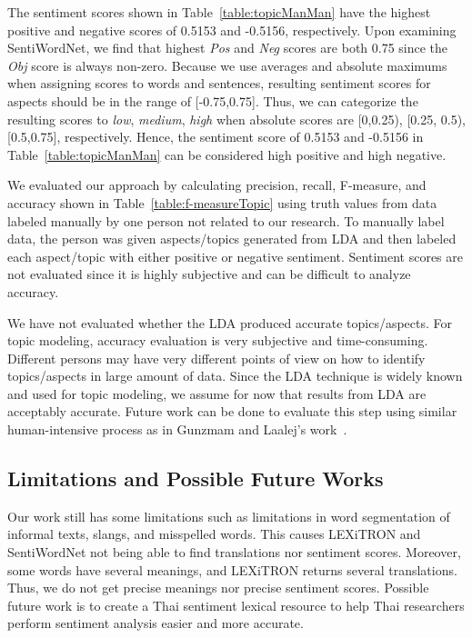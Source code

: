 The sentiment scores shown in Table~\ref{table:topicManMan} have the highest positive and negative scores of 0.5153 and -0.5156, respectively. Upon examining SentiWordNet, we find that highest \textit{Pos} and \textit{Neg} scores are both 0.75 since the \textit{Obj} score is always non-zero. Because we use averages and absolute maximums when assigning scores to words and sentences, resulting sentiment scores for aspects should be in the range of [-0.75,0.75]. Thus, we can categorize the resulting scores to \textit{low}, \textit{medium}, \textit{high} when absolute scores are [0,0.25), [0.25, 0.5), [0.5,0.75], respectively. Hence, the sentiment score of 0.5153 and -0.5156 in Table~\ref{table:topicManMan} can be considered high positive and high negative. 

We evaluated our approach by calculating precision, recall, F-measure, and accuracy shown in Table~\ref{table:f-measureTopic} using truth values from data labeled manually by one person not related to our research. To manually label data, the person was given aspects/topics generated from LDA and then labeled each aspect/topic with either positive or negative sentiment. Sentiment scores are not evaluated since it is highly subjective and can be difficult to analyze accuracy. 

We have not evaluated whether the LDA produced accurate topics/aspects. For topic modeling, accuracy evaluation is very subjective and time-consuming. Different persons may have very different points of view on how to identify topics/aspects in large amount of data.  Since the LDA technique is widely known and used for topic modeling, we assume for now that results from LDA are acceptably accurate. Future work can be done to evaluate this step using similar human-intensive process as in Gunzmam and Laalej's work~\cite{userslikefeature}.

\subsection*{Limitations and Possible Future Works}
Our work still has some limitations such as limitations in word segmentation of informal texts, slangs, and misspelled words. This causes LEXiTRON and SentiWordNet not being able to find translations nor sentiment scores. Moreover, some words have several meanings, and LEXiTRON returns several translations. Thus, we do not get precise meanings nor precise sentiment scores. Possible future work is to create a Thai sentiment lexical resource to help Thai researchers perform sentiment analysis easier and more accurate.

